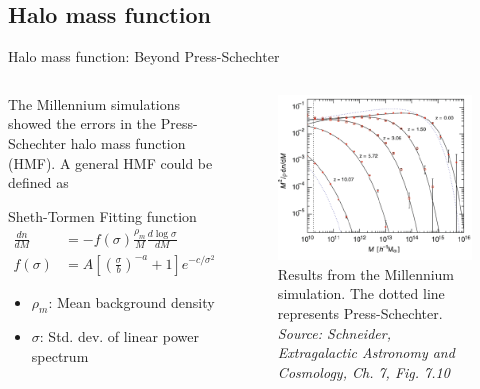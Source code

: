 \documentclass{beamer}
\begin{document}
\subsection{Halo mass function}
	\begin{frame}{Halo mass function: Beyond Press-Schechter}
		\begin{columns}
			\begin{column}{0.45\textwidth}
				\small The Millennium simulations showed the errors in the Press-Schechter halo mass function (HMF). A general HMF could be defined as
				\begin{block}{Sheth-Tormen Fitting function}
					\begin{equation}
					\begin{aligned}
					\frac{dn}{dM}&=-f(\sigma)\frac{\rho_m}{M}\frac{d\log\sigma}{dM}\\
					f(\sigma)&= A\left[\left(\frac{\sigma}{b}\right)^{-a}+1\right]e^{-c/\sigma^2}
					\end{aligned}
					\end{equation}
				\end{block}
				\begin{itemize}
					\item $\rho_m$: Mean background density
					\item $\sigma$: Std. dev. of linear power spectrum
				\end{itemize}
			\end{column}
			\begin{column}{0.5\textwidth}
				\begin{figure}
					\includegraphics[width=\textwidth]{mill-hmf.png}
					\caption{\tiny Results from the Millennium simulation. The dotted line represents Press-Schechter. \emph{Source: Schneider, Extragalactic Astronomy and Cosmology, Ch. 7, Fig. 7.10}}
					\label{fig:mill-sim}
				\end{figure}
			\end{column}
		\end{columns}
	\end{frame}
\end{document}
